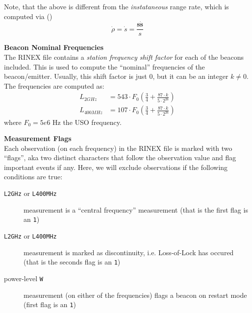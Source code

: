 Note, that the above is different from the \emph{instataneous} range rate, 
which is computed via (\cite{Montenbruck2000})
\begin{equation}
  \dot{\rho} = \dot{s} = \frac{\bm{s} \bm{\dot{s}}}{s}
\end{equation}

\textbf{Beacon Nominal Frequencies}\\
\label{beacon-nominal-frequencies}
The RINEX file contains a \emph{station frequency shift factor} for each of the 
beacons included. This is used to compute the ``nominal'' frequencies of the 
beacon/emitter. Usually, this shift factor is just $0$, but it can be an integer 
$k \neq 0$. The frequencies are computed as:
\begin{equation}
  \begin{align}
    L_{2GHz}   &= 543 \cdot F_0 \left( \frac{3}{4} + \frac{87\cdot k}{5 \cdot 2^{26}} \right) \\
    L_{400MHz} &= 107 \cdot F_0 \left( \frac{3}{4} + \frac{87\cdot k}{5 \cdot 2^{26}} \right) 
  \end{align}
\end{equation}
where $F_0 = 5e6 \text{ Hz}$ the USO frequency.

\textbf{Measurement Flags}\\
\label{measurement-flags}
Each observation (on each frequency) in the RINEX file is marked with two ``flags'', 
aka two distinct characters that follow the observation value and flag important 
events if any. Here, we will exclude observations if the following conditions are true:
\begin{description}
  \item[\texttt{L2GHz} or \texttt{L400MHz}] measurement is a ``central frequency'' 
  measurement (that is the first flag is an \texttt{1})
  \item[\texttt{L2GHz} or \texttt{L400MHz}] measurement is marked as discontinuity, 
  i.e. Loss-of-Lock has occured (that is the seconds flag is an \texttt{1})
  \item[power-level \texttt{W}] measurement (on either of the frequencies) flags 
  a beacon on restart mode (first flag is an \texttt{1})
\end{description}

